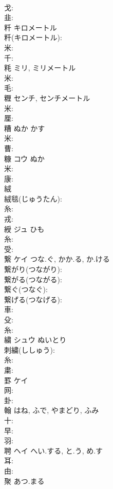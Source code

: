 \documentclass[8pt]{extreport}
\begin{document}
\begin{CJK}{UTF8}{min}
\\	戈: 
\\	韭: 
\\	粁		キロメートル			
\\	粁(キロメートル): 
\\	米: 
\\	千: 
\\	粍		ミリ, ミリメートル			
\\	米: 
\\	毛: 
\\	糎		センチ, センチメートル			
\\	米: 
\\	厘: 
\\	糟		ぬか	かす		
\\	米: 
\\	曹: 
\\	糠	コウ	ぬか		
\\	米: 
\\	康: 
\\	絨					
\\	絨毯(じゅうたん): 
\\	糸: 
\\	戎: 
\\	綬	ジュ	ひも		
\\	糸: 
\\	受: 
\\	繋	ケイ	つな.ぐ, かか.る, か.ける		
\\	繋がり(つながり): 
\\	繋がる(つながる): 
\\	繋ぐ(つなぐ): 
\\	繋げる(つなげる): 
\\	車: 
\\	殳: 
\\	糸: 
\\	繍	シュウ	ぬいとり		
\\	刺繍(ししゅう): 
\\	糸: 
\\	粛: 
\\	罫	ケイ			
\\	网: 
\\	卦: 
\\	翰		はね, ふで, やまどり, ふみ			
\\	十: 
\\	早: 
\\	羽: 
\\	聘	ヘイ	へい.する, と.う, め.す		
\\	耳: 
\\	由: 
\\	聚		あつ.まる			

\end{CJK}
\end{document}
